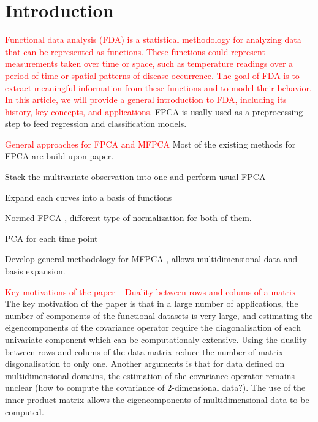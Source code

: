 \section{Introduction} %
\label{sec:introduction}

\textcolor{red}{Functional data analysis (FDA) is a statistical methodology for analyzing data that can be represented as functions. These functions could represent measurements taken over time or space, such as temperature readings over a period of time or spatial patterns of disease occurrence. The goal of FDA is to extract meaningful information from these functions and to model their behavior. In this article, we will provide a general introduction to FDA, including its history, key concepts, and applications.}
FPCA is usally used as a preprocessing step to feed regression and classification models.

\textcolor{red}{General approaches for FPCA and MFPCA}
Most of the existing methods for FPCA are build upon \cite{ramsayFunctionalDataAnalysis2005} paper. 

Stack the multivariate observation into one and perform usual FPCA \cite{ramsayFunctionalDataAnalysis2005}

Expand each curves into a basis of functions \cite{jacquesModelbasedClusteringMultivariate2014a}

Normed FPCA \cite{jacquesModelbasedClusteringMultivariate2014a,chiouMultivariateFunctionalPrincipal2014}, different type of normalization for both of them.

PCA for each time point \cite{berrenderoPrincipalComponentsMultivariate2011}

Develop general methodology for MFPCA \cite{happMultivariateFunctionalPrincipal2015}, allows multidimensional data and basis expansion.

\textcolor{red}{Key motivations of the paper -- Duality between rows and colums of a matrix}
The key motivation of the paper is that in a large number of applications, the number of components of the functional datasets is very large, and estimating the eigencomponents of the covariance operator require the diagonalisation of each univariate component which can be computationaly extensive. Using the duality between rows and colums of the data matrix reduce the number of matrix disgonalisation to only one. Another arguments is that for data defined on multidimensional domains, the estimation of the covariance operator remains unclear (how to compute the covariance of 2-dimensional data?). The use of the inner-product matrix allows the eigencomponents of multidimensional data to be computed.

